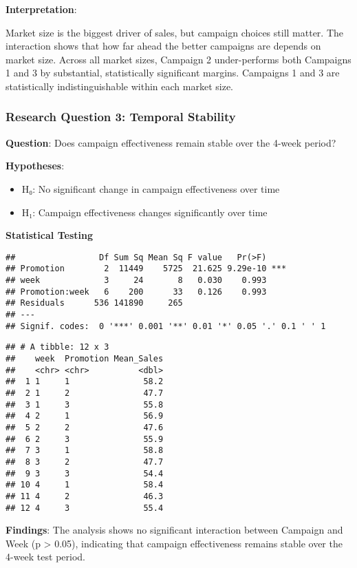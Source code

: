 \documentclass[
]{article}
\providecommand{\tightlist}{%
  \setlength{\itemsep}{0pt}\setlength{\parskip}{0pt}}
\begin{document}
\textbf{Interpretation}:

Market size is the biggest driver of sales, but campaign choices still
matter. The interaction shows that how far ahead the better campaigns
are depends on market size. Across all market sizes, Campaign 2
under-performs both Campaigns 1 and 3 by substantial, statistically
significant margins. Campaigns 1 and 3 are statistically
indistinguishable within each market size.

\subsubsection{Research Question 3: Temporal
Stability}\label{research-question-3-temporal-stability}

\textbf{Question}: Does campaign effectiveness remain stable over the
4-week period?

\textbf{Hypotheses}:

\begin{itemize}
\tightlist
\item
  H₀: No significant change in campaign effectiveness over time
\item
  H₁: Campaign effectiveness changes significantly over time
\end{itemize}

\textbf{Statistical Testing}

\begin{verbatim}
##                 Df Sum Sq Mean Sq F value   Pr(>F)    
## Promotion        2  11449    5725  21.625 9.29e-10 ***
## week             3     24       8   0.030    0.993    
## Promotion:week   6    200      33   0.126    0.993    
## Residuals      536 141890     265                     
## ---
## Signif. codes:  0 '***' 0.001 '**' 0.01 '*' 0.05 '.' 0.1 ' ' 1
\end{verbatim}

\begin{verbatim}
## # A tibble: 12 x 3
##    week  Promotion Mean_Sales
##    <chr> <chr>          <dbl>
##  1 1     1               58.2
##  2 1     2               47.7
##  3 1     3               55.8
##  4 2     1               56.9
##  5 2     2               47.6
##  6 2     3               55.9
##  7 3     1               58.8
##  8 3     2               47.7
##  9 3     3               54.4
## 10 4     1               58.4
## 11 4     2               46.3
## 12 4     3               55.4
\end{verbatim}

\textbf{Findings}: The analysis shows no significant interaction between
Campaign and Week (p \textgreater{} 0.05), indicating that campaign
effectiveness remains stable over the 4-week test period.
\end{document}
